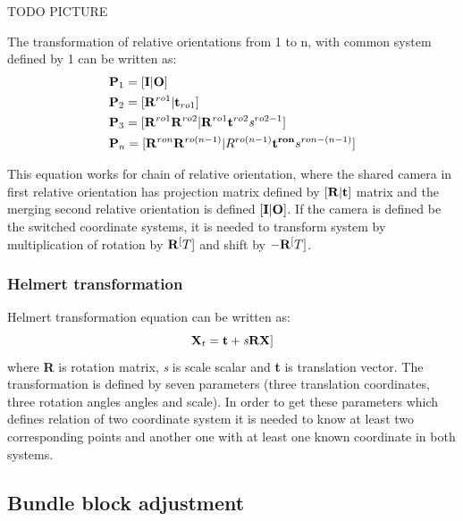 \documentclass[a4paper,12pt]{article}
\newcommand{\ematr}[1]{
{\bf #1}
}
\newcommand{\evect}[1]{
{\bf #1}
}
\newcommand{\escal}[1]{
{\it #1}
}
\begin{document}
TODO PICTURE

The transformation of relative orientations from 1 to n, with common system defined by 1 can be written as: 
\begin{equation}
\label{eq:comm_rel}
\begin{split}
&\ematr{P}_{1} = [\ematr{I}|\evect{O}] \\
&\ematr{P}_{2} = [\ematr{R}^{ro1}|\evect{t}_{ro1}] \\
&\ematr{P}_{3} = [\ematr{R}^{ro1} \ematr{R}^{ro2}| \ematr{R}^{ro1} \evect{t}^{ro2} \escal{s}^{ro2-1}] \\
&\ematr{P}_{n} = [\ematr{R}^{ron} \ematr{R}^{ro(n - 1)}| R^{ro(n - 1)} \evect{t^{ron}} {s}^{ron- (n-1)}] \\
\end{split}
\end{equation}


This equation works for chain of relative orientation, where the shared camera in first relative orientation has 
projection matrix defined by $[\ematr{R}|\evect{t}]$ matrix and the merging second relative orientation is 
defined $[\ematr{I}|\ematr{O}]$. If the camera is defined be the switched coordinate systems, it is needed to 
transform system by multiplication of rotation by $\ematr{R}^[T]$ and shift by $-\ematr{R}^[T]$.

\subsubsection{Helmert transformation}
\label{sec:helmert}

Helmert transformation equation can be written as:
\begin{equation}
\ematr{X}_{t} = \evect{t} + \escal{s}\ematr{R}\evect{X}] \\
\end{equation}
where \ematr{R} is rotation matrix, \escal{s} is scale scalar and  \evect{t} is translation vector.
The transformation is defined by seven parameters (three translation coordinates, three rotation angles angles and scale).
In order to get these parameters which defines relation of two coordinate system it is needed to know at least two corresponding points and  another one with 
at least one known coordinate in both systems. 



\subsection{Bundle block adjustment}
\end{document}
